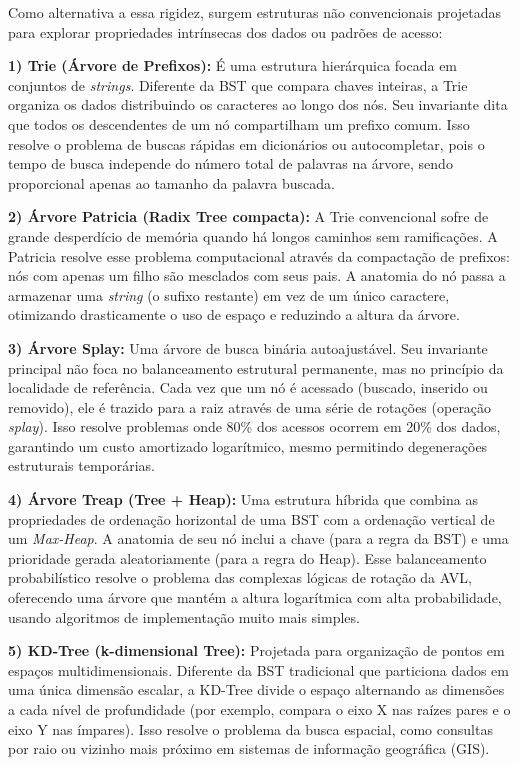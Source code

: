 \documentclass[conference]{IEEEtran}
\begin{document}
Como alternativa a essa rigidez, surgem estruturas não convencionais projetadas para explorar propriedades intrínsecas dos dados ou padrões de acesso:

\textbf{1) Trie (Árvore de Prefixos):} É uma estrutura hierárquica focada em conjuntos de \textit{strings}. Diferente da BST que compara chaves inteiras, a Trie organiza os dados distribuindo os caracteres ao longo dos nós. Seu invariante dita que todos os descendentes de um nó compartilham um prefixo comum. Isso resolve o problema de buscas rápidas em dicionários ou autocompletar, pois o tempo de busca independe do número total de palavras na árvore, sendo proporcional apenas ao tamanho da palavra buscada.

\textbf{2) Árvore Patricia (Radix Tree compacta):} A Trie convencional sofre de grande desperdício de memória quando há longos caminhos sem ramificações. A Patricia resolve esse problema computacional através da compactação de prefixos: nós com apenas um filho são mesclados com seus pais. A anatomia do nó passa a armazenar uma \textit{string} (o sufixo restante) em vez de um único caractere, otimizando drasticamente o uso de espaço e reduzindo a altura da árvore.

\textbf{3) Árvore Splay:} Uma árvore de busca binária autoajustável. Seu invariante principal não foca no balanceamento estrutural permanente, mas no princípio da localidade de referência. Cada vez que um nó é acessado (buscado, inserido ou removido), ele é trazido para a raiz através de uma série de rotações (operação \textit{splay}). Isso resolve problemas onde 80\% dos acessos ocorrem em 20\% dos dados, garantindo um custo amortizado logarítmico, mesmo permitindo degenerações estruturais temporárias.

\textbf{4) Árvore Treap (Tree + Heap):} Uma estrutura híbrida que combina as propriedades de ordenação horizontal de uma BST com a ordenação vertical de um \textit{Max-Heap}. A anatomia de seu nó inclui a chave (para a regra da BST) e uma prioridade gerada aleatoriamente (para a regra do Heap). Esse balanceamento probabilístico resolve o problema das complexas lógicas de rotação da AVL, oferecendo uma árvore que mantém a altura logarítmica com alta probabilidade, usando algoritmos de implementação muito mais simples.

\textbf{5) KD-Tree (k-dimensional Tree):} Projetada para organização de pontos em espaços multidimensionais. Diferente da BST tradicional que particiona dados em uma única dimensão escalar, a KD-Tree divide o espaço alternando as dimensões a cada nível de profundidade (por exemplo, compara o eixo X nas raízes pares e o eixo Y nas ímpares). Isso resolve o problema da busca espacial, como consultas por raio ou vizinho mais próximo em sistemas de informação geográfica (GIS).
\end{document}
